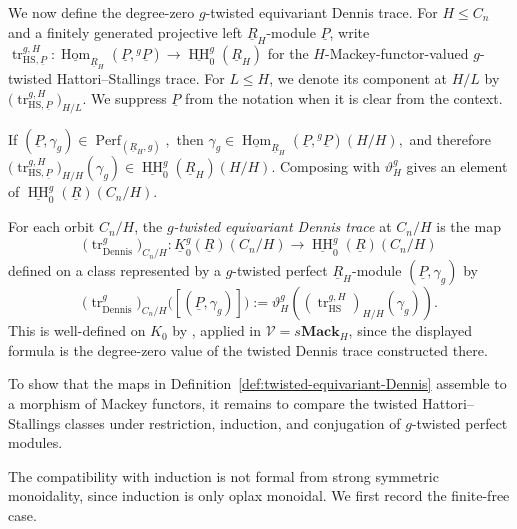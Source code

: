 \documentclass[11pt,oneside]{amsart}
\DeclareMathOperator{\Hom}{Hom}
\DeclareMathOperator{\HH}{HH}
\DeclareMathOperator{\tr}{tr}
\numberwithin{equation}{section}
\numberwithin{figure}{section}
\theoremstyle{plain}
\theoremstyle{definition}
\theoremstyle{remark}
\begin{document}
We now define the degree-zero \(g\)-twisted equivariant Dennis trace.
For \(H\leq C_n\) and a finitely generated projective left
\(\underline R_H\)-module \(\underline P\), write
\(
\operatorname{tr}_{\mathrm{HS},\underline P}^{g,H}\colon
\underline{\Hom}_{\underline R_H}
   (\underline P,{}^g\underline P)
\to
\underline{\HH}_0^g(\underline R_H)
\)
for the \(H\)-Mackey-functor-valued \(g\)-twisted
Hattori--Stallings trace.  For \(L\leq H\), we denote its component at
\(H/L\) by
\(
\bigl(
\operatorname{tr}_{\mathrm{HS},\underline P}^{g,H}
\bigr)_{H/L}.
\)
We suppress \(\underline P\) from the notation when it is clear from
the context.

If
\(
(\underline P,\gamma_g)\in
\operatorname{Perf}_{(\underline R_H,g)},
\)
then
\(
\gamma_g\in
\underline{\Hom}_{\underline R_H}
(\underline P,{}^g\underline P)(H/H),
\)
and therefore
\(
\bigl(
\operatorname{tr}_{\mathrm{HS},\underline P}^{g,H}
\bigr)_{H/H}(\gamma_g)
\in
\underline{\HH}_0^g(\underline R_H)(H/H).
\)
Composing with \(\vartheta_H^g\) gives an element of
\(\underline{\HH}_0^g(\underline R)(C_n/H)\).

\begin{definition}\label{def:twisted-equivariant-Dennis}
For each orbit \(C_n/H\), the \emph{\(g\)-twisted equivariant Dennis trace} at \(C_n/H\) is the map
\[
\bigl(\tr_{\mathrm{Dennis}}^g\bigr)_{C_n/H}\colon
\underline K_0^g(\underline R)(C_n/H)
\longrightarrow
\underline{\HH}_0^g(\underline R)(C_n/H)
\]
defined on a class represented by a \(g\)-twisted perfect
\(\underline R_H\)-module
\((\underline P,\gamma_{g})\) by
\[
\bigl(\tr_{\mathrm{Dennis}}^g\bigr)_{C_n/H}
\bigl([(\underline P,\gamma_{g})]\bigr)
:=
\vartheta_H^g
\left(
(\tr_{\mathrm{HS}}^{g,H})_{H/H}
(\gamma_{g})
\right).
\]
This is well-defined on \(K_0\) by
\cite[Theorem~6.1.1 and Remark~6.1.3]{AGHKK}, applied in
\(\mathcal V=s\mathbf{Mack}_H\), since the displayed formula is the
degree-zero value of the twisted Dennis trace constructed there.

\end{definition}
 

To show that the maps in Definition~\ref{def:twisted-equivariant-Dennis}
assemble to a morphism of Mackey functors, it remains to compare the
twisted Hattori--Stallings classes under restriction, induction, and
conjugation of \(g\)-twisted perfect modules.

The compatibility with induction is not formal from strong symmetric
monoidality, since induction is only oplax monoidal. We first record the
finite-free case.
\end{document}
